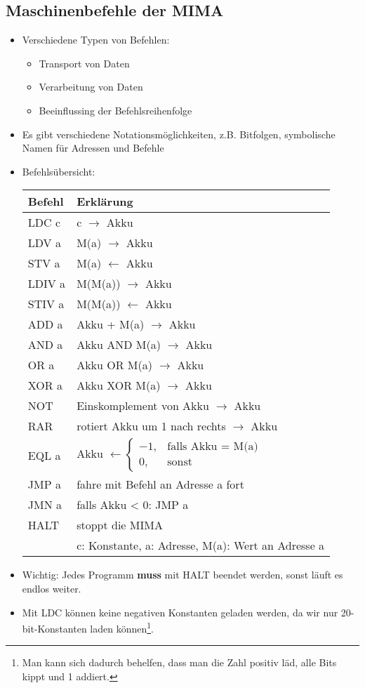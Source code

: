 \documentclass{article}
\newcommand{\important}[1]{\textcolor{importantColor}{#1}}
\begin{document}
\subsection{Maschinenbefehle der MIMA}
\begin{itemize}
    \item Verschiedene Typen von Befehlen:
    \begin{itemize}
        \item Transport von Daten
        \item Verarbeitung von Daten
        \item Beeinflussing der Befehlsreihenfolge
    \end{itemize}
    \item Es gibt verschiedene Notationsmöglichkeiten, z.B. Bitfolgen, symbolische Namen für Adressen und Befehle
    \item Befehlsübersicht:\\
        \begin{tabular}[h]{l|l}
        Befehl & Erklärung \\
        \hline
        LDC c & c $\to$ Akku  \\
        LDV a & M(a) $\to$ Akku  \\
        STV a & M(a) $\leftarrow$ Akku  \\
        LDIV a & M(M(a)) $\to$ Akku  \\
        STIV a & M(M(a)) $\leftarrow$ Akku  \\
        \hline
        ADD a & Akku + M(a) $\to$ Akku\\
        AND a & Akku AND M(a) $\to$ Akku\\
        OR  a & Akku OR M(a) $\to$ Akku\\
        XOR a & Akku XOR M(a) $\to$ Akku\\
        NOT & Einskomplement von Akku $\to$ Akku\\
        RAR & rotiert Akku um 1 nach rechts $\to$ Akku\\
        \hline
        EQL a & Akku $\leftarrow
        \begin{cases}
            -1, &\text{falls Akku = M(a)}\\
            0, &\text{sonst}
        \end{cases}$\\
        \hline
        JMP a & fahre mit Befehl an Adresse a fort\\
        JMN a & falls Akku < 0: JMP a\\
        HALT & stoppt die MIMA\\
        \hline\hline
        &c: Konstante, a: Adresse, M(a): Wert an Adresse a
        \end{tabular}
    \item Wichtig: \important{Jedes Programm \textbf{muss} mit HALT beendet werden}, sonst läuft es endlos weiter.
    \item Mit LDC können keine negativen Konstanten geladen werden, da wir nur 20-bit-Konstanten laden können\footnote{Man kann sich dadurch behelfen, dass man die Zahl positiv läd, alle Bits kippt und 1 addiert.}.
\end{itemize}
\end{document}
